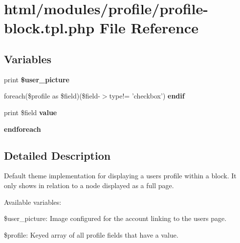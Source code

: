 \hypertarget{profile-block_8tpl_8php}{
\section{html/modules/profile/profile-\/block.tpl.php File Reference}
\label{profile-block_8tpl_8php}
}
\subsection*{Variables}
\begin{DoxyCompactItemize}
\item 
\hypertarget{profile-block_8tpl_8php_a2662269aca0f9faedd1ee9e41828ea4c}{
print {\bfseries \$user\_\-picture}}
\label{profile-block_8tpl_8php_a2662269aca0f9faedd1ee9e41828ea4c}

\item 
\hypertarget{profile-block_8tpl_8php_ab10daa0a3e623adbea91445542c11cac}{
foreach(\$profile as \$field)(\$field-\/$>$type!= 'checkbox') {\bfseries endif}}
\label{profile-block_8tpl_8php_ab10daa0a3e623adbea91445542c11cac}

\item 
\hypertarget{profile-block_8tpl_8php_a0a58448988969e4dbe0aa7814b5a29fc}{
print \$field {\bfseries value}}
\label{profile-block_8tpl_8php_a0a58448988969e4dbe0aa7814b5a29fc}

\item 
\hypertarget{profile-block_8tpl_8php_a672d9707ef91db026c210f98cc601123}{
{\bfseries endforeach}}
\label{profile-block_8tpl_8php_a672d9707ef91db026c210f98cc601123}

\end{DoxyCompactItemize}


\subsection{Detailed Description}
Default theme implementation for displaying a users profile within a block. It only shows in relation to a node displayed as a full page.

Available variables:
\begin{DoxyItemize}
\item \$user\_\-picture: Image configured for the account linking to the users page.
\item \$profile: Keyed array of all profile fields that have a value.
\end{DoxyItemize}

